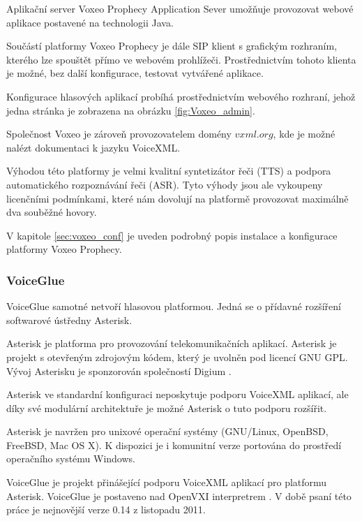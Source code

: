 \documentclass[ing,male,java,dept460,twoside]{diploma}						%
\begin{document}
Aplikační server Voxeo Prophecy Application Sever umožňuje provozovat webové aplikace postavené na technologii Java.

Součástí platformy Voxeo Prophecy je dále SIP klient s grafickým rozhraním, kterého lze spouštět přímo ve webovém prohlížeči. Prostřednictvím tohoto klienta je možné, bez další konfigurace, testovat vytvářené aplikace.

Konfigurace hlasových aplikací probíhá prostřednictvím webového rozhraní, jehož jedna stránka je zobrazena na obrázku \ref{fig:Voxeo_admin}.

Společnost Voxeo je zároveň provozovatelem domény $vxml.org$, kde je možné nalézt dokumentaci k jazyku VoiceXML.

Výhodou této platformy je velmi kvalitní syntetizátor řeči (TTS) a podpora automatického rozpoznávání řeči (ASR). Tyto výhody jsou ale vykoupeny licenčními podmínkami, které nám dovolují na platformě provozovat maximálně dva souběžné hovory.

V kapitole \ref{sec:voxeo_conf} je uveden podrobný popis instalace a konfigurace platformy Voxeo Prophecy.

\subsubsection{VoiceGlue}
\label{sec:voiceglue}
VoiceGlue samotné netvoří hlasovou platformou. Jedná se o přídavné rozšíření softwarové ústředny Asterisk.

Asterisk je platforma pro provozování telekomunikačních aplikací. Asterisk je projekt s otevřeným zdrojovým kódem, který je uvolněn pod licencí GNU GPL. Vývoj Asterisku je sponzorován společností Digium \cite{asterisk_org}.

Asterisk ve standardní konfiguraci neposkytuje podporu VoiceXML aplikací, ale díky své modulární architektuře je možné Asterisk o tuto podporu rozšířit.

Asterisk je navržen pro unixové operační systémy (GNU/Linux, OpenBSD, FreeBSD, Mac OS X). K dispozici je i komunitní verze portována do prostředí operačního systému Windows.

VoiceGlue je projekt přinášející podporu VoiceXML aplikací pro platformu Asterisk. VoiceGlue je postaveno nad OpenVXI interpretrem \cite{voiceglue_org}. V době psaní této práce je nejnovější verze 0.14 z listopadu 2011.

\end{document}
